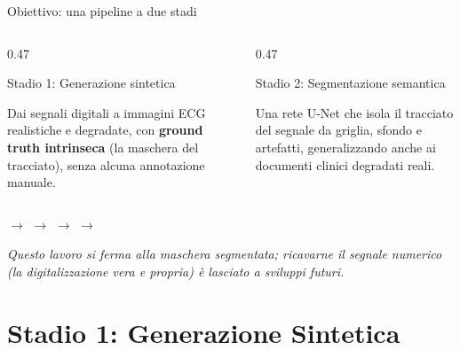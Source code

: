 \documentclass[aspectratio=169,11pt]{beamer}
\begin{document}
\begin{frame}{Obiettivo: una pipeline a due stadi}
  \vfill
  \begin{columns}[T,onlytextwidth]
    \begin{column}{0.47\textwidth}
      \begin{block}{Stadio 1: Generazione sintetica}
        \begin{minipage}[t][1.9cm]{\linewidth}
          Dai segnali digitali a immagini ECG realistiche e \alert{degradate}, con \textbf{ground truth intrinseca} (la maschera del tracciato), senza alcuna annotazione manuale.
        \end{minipage}
      \end{block}
    \end{column}
    \hfill
    \begin{column}{0.47\textwidth}
      \begin{block}{Stadio 2: Segmentazione semantica}
        \begin{minipage}[t][1.9cm]{\linewidth}
          Una rete U-Net che \alert{isola il tracciato} del segnale da griglia, sfondo e artefatti, generalizzando anche ai documenti clinici degradati reali.
        \end{minipage}
      \end{block}
    \end{column}
  \end{columns}
  \vfill
  \begin{center}
    \footnotesize
     $\rightarrow$  $\rightarrow$  $\rightarrow$  $\rightarrow$ 
  \end{center}
  \vfill
  \begin{center}\footnotesize\textit{Questo lavoro si ferma alla maschera segmentata; ricavarne il segnale numerico (la digitalizzazione vera e propria) è lasciato a sviluppi futuri.}\end{center}
  \vfill
\end{frame}

\section{Stadio 1: Generazione Sintetica}
\end{document}
